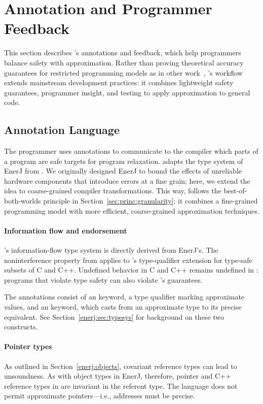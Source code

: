 \section{Annotation and Programmer Feedback}
\label{accept:sec:annotation-feedback}

This section describes \sysname's annotations and feedback,
which help programmers balance safety with approximation.
Rather than proving theoretical accuracy guarantees for restricted programming
models as in other work~\cite{sasa-sas11, zhu-popl12, passert},
\sysname's workflow extends mainstream development practices: it combines
lightweight safety guarantees, programmer insight, and testing to apply
approximation to general code.

\subsection{Annotation Language}
\label{accept:sec:language}

The programmer uses annotations to communicate to the compiler which parts of
a program are safe targets for program relaxation.
\sysname adapts the type system of EnerJ from .
We originally designed EnerJ to bound the effects of unreliable hardware
components that introduce errors at a fine grain;
here, we extend the idea to coarse-grained compiler transformations.
This way, \sysname follows the best-of-both-worlds principle in
Section~\ref{sec:princ:granularity}: it combines a fine-grained programming
model with more efficient,
coarse-grained approximation techniques.

\paragraph{Information flow and endorsement}
\sysname's information-flow type system is directly derived from EnerJ's.
The noninterference property from  applies
to \sysname's
type-qualifier extension for type-safe subsets of C and C++.
Undefined behavior in C and C++ remains undefined in \sysname:
programs that violate type safety can also violate \sysname's guarantees.

The annotations consist of an  keyword, a type qualifier marking
approximate values, and an  keyword, which casts from an
approximate type to its precise equivalent. See
Section~\ref{enerj:sec:typesys} for background on these two constructs.

\paragraph{Pointer types}
As outlined in Section~\ref{enerj:objects}, covariant reference types can
lead to unsoundness.
As with object types in EnerJ, therefore, pointer and C++ reference types in \sysname are invariant in the referent type.
The language does not permit approximate pointers---i.e., addresses must be
precise.

